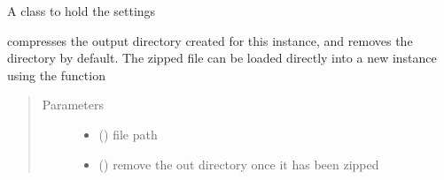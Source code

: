 \documentclass[letterpaper,10pt,english]{sphinxmanual}
\begin{document}
\begin{fulllineitems}
\begin{fulllineitems}
\label{\detokenize{hs_io_api:hotspots.hs_io.HotspotWriter.Settings}}
A class to hold the {\hyperref[\detokenize{hs_io_api:hotspots.hs_io.HotspotWriter}]{}} settings

\end{fulllineitems}


\begin{fulllineitems}
\label{\detokenize{hs_io_api:hotspots.hs_io.HotspotWriter.compress}}
compresses the output directory created for this  instance, and
removes the directory by default. The zipped file can be loaded directly into a new
 instance using the
 function
\begin{quote}\begin{description}
\item[{Parameters}] \leavevmode\begin{itemize}
\item {} 
 () \textendash{} file path

\item {} 
 () \textendash{} remove the out directory once it has been zipped

\end{itemize}

\end{description}\end{quote}

\end{fulllineitems}



\end{fulllineitems}
\end{document}

